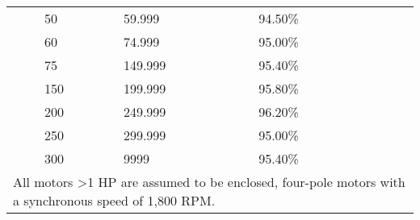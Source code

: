 \begin{table}[htbp]
\begin{tabular}{|p{1.4cm}|p{1.5cm}|p{1.5cm}|p{1.5cm}|p{2cm}|}
 & 50      & 59.999  & 94.50\% &                                           \\ \cline{2-4}
 & 60      & 74.999  & 95.00\% &                                           \\ \cline{2-4}
 & 75      & 149.999 & 95.40\% &                                           \\ \cline{2-4}
 & 150     & 199.999 & 95.80\% &                                           \\ \cline{2-4}
 & 200     & 249.999 & 96.20\% &                                           \\ \cline{2-4}
 & 250     & 299.999 & 95.00\% &                                           \\ \cline{2-4}
 & 300     & 9999    & 95.40\% &                                           \\ \hline
 \multicolumn{5}{l}{All motors >1 HP are assumed to be enclosed, four-pole motors with a synchronous speed of 1,800 RPM.}
\end{tabular}
\end{table}